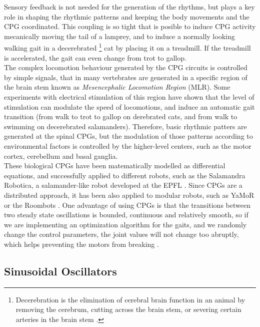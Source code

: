 Sensory feedback is not needed for the generation of the rhythms, but plays a key role in shaping the rhythmic patterns and keeping the body movements and the CPG coordinated. This coupling is so tight that is posible to induce CPG activity mecanically moving the tail of a lamprey, and to induce a normally looking walking gait in a decerebrated \footnote{Decerebration is the elimination of cerebral brain function in an animal by removing the cerebrum, cutting across the brain stem, or severing certain arteries in the brain stem \cite{}.} cat by placing it on a treadmill. If the treadmill is accelerated, the gait can even change from trot to gallop.\\

The complex locomotion behaviour generated by the CPG circuits is controlled by simple signals, that in many vertebrates are generated in a specific region of the brain stem known as \emph{Mesencephalic Locomotion Region} (MLR). Some experiments with electrical stimulation of this region have shown that the level of stimulation can modulate the speed of locomotions, and induce an automatic gait transition (from walk to trot to gallop on derebrated cats, and from walk to swimming on decerebrated salamanders). Therefore, basic rhythmic patters are generated at the spinal CPGs, but the modulation of those patterns according to environmental factors is controlled by the higher-level centers, such as the motor cortex, cerebellum and basal ganglia.\\

These biological CPGs have been matematically modelled as differential equations, and successfully applied to different robots, such as the Salamandra Robotica, a salamander-like robot developed at the EPFL \cite{}. Since CPGs are a distributed approach, it has been also applied to modular robots, such as YaMoR \cite{} or the Roombots \cite{}. One advantage of using CPGs is that the transitions between two steady state oscillations is bounded, continuous and relatively smooth, so if we are implementing an optimization algorithm for the gaits, and we randomly change the control parameters, the joint values will not change too abruptly, which helps preventing the motors from breaking \cite{}.\\

\subsection{Sinusoidal Oscillators}
\label{gait_sin_osc}

